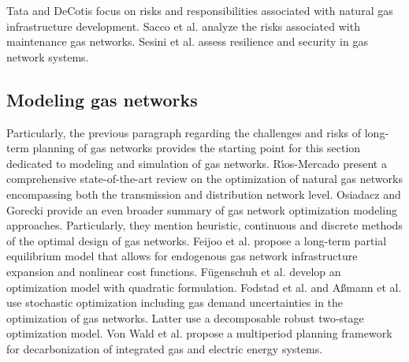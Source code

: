  Tata and DeCotis \cite{tata2019natural} focus on risks and responsibilities associated with natural gas infrastructure development.  Sacco et al. \cite{sacco2019portfolio} analyze the risks associated with maintenance gas networks. Sesini et al. \cite{sesini2020impact} assess resilience and security in gas network systems. 

\subsection{Modeling gas networks}\label{state:2}
Particularly, the previous paragraph regarding the challenges and risks of long-term planning of gas networks provides the starting point for this section dedicated to modeling and simulation of gas networks. R{\'\i}os-Mercado \cite{rios2015optimization} present a comprehensive state-of-the-art review on the optimization of natural gas networks encompassing both the transmission and distribution network level. Osiadacz and Gorecki \cite{osiadacz1995optimization} provide an even broader summary of gas network optimization modeling approaches. Particularly, they mention heuristic, continuous and discrete methods of the optimal design of gas networks. Feijoo et al. \cite{feijoo2016north} propose a long-term partial equilibrium model that allows for endogenous
gas network infrastructure expansion and nonlinear cost functions. Fügenschuh et al. \cite{fugenschuh2011gas} develop an optimization model with quadratic formulation. Fodstad et al. \cite{fodstad2016stochastic} and Aßmann et al. \cite{assmann2019decomposable} use stochastic optimization including gas demand uncertainties in the optimization of gas networks. Latter use a decomposable robust two-stage optimization model. Von Wald et al. \cite{von2022optimal} propose a multiperiod planning framework for decarbonization of integrated gas and electric energy systems. \vspace{0.35cm}

